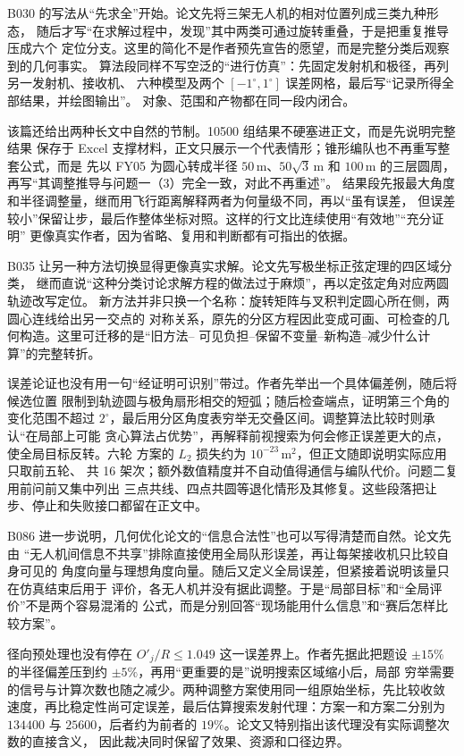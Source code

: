B030 的写法从“先求全”开始。论文先将三架无人机的相对位置列成三类九种形态，
随后才写“在求解过程中，发现”其中两类可通过旋转重叠，于是把重复推导压成六个
定位分支。这里的简化不是作者预先宣告的愿望，而是完整分类后观察到的几何事实。
算法段同样不写空泛的“进行仿真”：先固定发射机和极径，再列另一发射机、接收机、
六种模型及两个 $[-1^\circ,1^\circ]$ 误差网格，最后写“记录所得全部结果，并绘图输出”。
对象、范围和产物都在同一段内闭合。

该篇还给出两种长文中自然的节制。10500 组结果不硬塞进正文，而是先说明完整结果
保存于 Excel 支撑材料，正文只展示一个代表情形；锥形编队也不再重写整套公式，而是
先以 FY05 为圆心转成半径 $50\,\mathrm{m}$、$50\sqrt{3}\,\mathrm{m}$ 和
$100\,\mathrm{m}$ 的三层圆周，再写“其调整推导与问题一（3）完全一致，对此不再重述”。
结果段先报最大角度和半径调整量，继而用飞行距离解释两者为何量级不同，再以“虽有误差，
但误差较小”保留让步，最后作整体坐标对照。这样的行文比连续使用“有效地”“充分证明”
更像真实作者，因为省略、复用和判断都有可指出的依据。

B035 让另一种方法切换显得更像真实求解。论文先写极坐标正弦定理的四区域分类，
继而直说“这种分类讨论求解方程的做法过于麻烦”，再以定弦定角对应两圆轨迹改写定位。
新方法并非只换一个名称：旋转矩阵与叉积判定圆心所在侧，两圆心连线给出另一交点的
对称关系，原先的分区方程因此变成可画、可检查的几何构造。这里可迁移的是“旧方法--
可见负担--保留不变量--新构造--减少什么计算”的完整转折。

误差论证也没有用一句“经证明可识别”带过。作者先举出一个具体偏差例，随后将候选位置
限制到轨迹圆与极角扇形相交的短弧；随后检查端点，证明第三个角的变化范围不超过
$2^\circ$，最后用分区角度表穷举无交叠区间。调整算法比较时则承认“在局部上可能
贪心算法占优势”，再解释前视搜索为何会修正误差更大的点，使全局目标反转。六轮
方案的 $L_2$ 损失约为 $10^{-23}\,\mathrm{m}^2$，但正文随即说明实际应用只取前五轮、
共 16 架次；额外数值精度并不自动值得通信与编队代价。问题二复用前问前又集中列出
三点共线、四点共圆等退化情形及其修复。这些段落把让步、停止和失败接口都留在正文中。

B086 进一步说明，几何优化论文的“信息合法性”也可以写得清楚而自然。论文先由
“无人机间信息不共享”排除直接使用全局队形误差，再让每架接收机只比较自身可见的
角度向量与理想角度向量。随后又定义全局误差，但紧接着说明该量只在仿真结束后用于
评价，各无人机并没有据此调整。于是“局部目标”和“全局评价”不是两个容易混淆的
公式，而是分别回答“现场能用什么信息”和“赛后怎样比较方案”。

径向预处理也没有停在 $O'_j/R\leq1.049$ 这一误差界上。作者先据此把题设
$\pm15\%$ 的半径偏差压到约 $\pm5\%$，再用“更重要的是”说明搜索区域缩小后，局部
穷举需要的信号与计算次数也随之减少。两种调整方案使用同一组原始坐标，先比较收敛
速度，再比稳定性尚可定误差，最后估算搜索发射代理：方案一和方案二分别为 $134400$ 与
$25600$，后者约为前者的 $19\%$。论文又特别指出该代理没有实际调整次数的直接含义，
因此裁决同时保留了效果、资源和口径边界。

